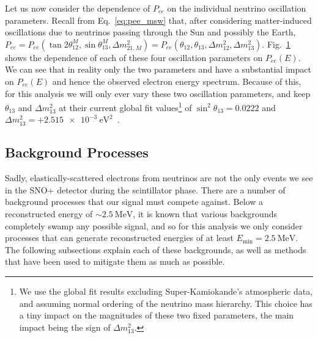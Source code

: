 Let us now consider the dependence of $P_{ee}$ on the individual neutrino oscillation parameters. Recall from Eq.~\ref{eq:pee_msw} %
that, after considering matter-induced oscillations due to neutrinos passing through the Sun and possibly the Earth, $P_{ee} = P_{ee}\left(\tan2\theta^{M}_{12}, \sin\theta^{M}_{13}, \Delta m^{2}_{21,M}\right) = P_{ee}\left(\theta_{12}, \theta_{13}, \Delta m^{2}_{12}, \Delta m^{2}_{13}\right)$. Fig.~\ref{fig:pee_osc_param_dependence} shows the dependence of each of these four oscillation parameters on $P_{ee}(E)$. We can see that in reality only the two parameters \dmsq{} and \tonetwo{} have a substantial impact on $P_{ee}(E)$ and hence the observed electron energy spectrum. Because of this, for this analysis we will only ever vary these two oscillation parameters, and keep $\theta_{13}$ and $\Delta m^{2}_{13}$ at their current global fit values\footnote{We use the global fit results excluding Super-Kamiokande's atmospheric data, and assuming normal ordering of the neutrino mass hierarchy. This choice has a tiny impact on the magnitudes of these two fixed parameters, the main impact being the sign of $\Delta m^{2}_{13}$.} %
of $\sin^{2}\theta_{13} = 0.0222$ and $\Delta m^{2}_{13} = +\SI{2.515e-3}{\eV\squared}$~\cite{estebanFateHintsUpdated2020}.%

\begin{figure}
    \centering
    \caption[]{}
    \label{fig:pee_osc_param_dependence}
\end{figure}

\subsection{Background Processes}\label{sec:background_processes}
Sadly, elastically-scattered electrons from \beight{} neutrinos are not the only events we see in the SNO+ detector during the scintillator phase. There are a number of background processes that our signal must compete against. Below a reconstructed energy of $\sim\SI{2.5}{\MeV}$, it is known that various backgrounds completely swamp any possible \beight{} signal, and so for this analysis we only consider processes that can generate reconstructed energies of at least $E_{\textrm{min}} = \SI{2.5}{\MeV}$. The following subsections explain each of these backgrounds, as well as methods that have been used to mitigate them as much as possible.

